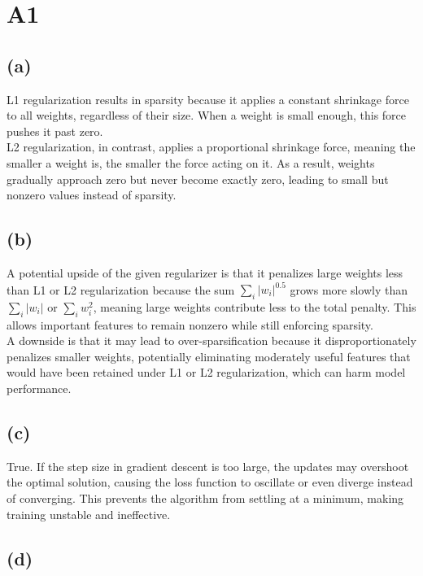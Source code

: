 \documentclass{article}
\begin{document}
\section*{A1}

\subsection*{(a)}

L1 regularization results in sparsity because it applies a constant shrinkage force to all weights, regardless of their size. When a weight is small enough, this force pushes it past zero.\\

\noindent L2 regularization, in contrast, applies a proportional shrinkage force, meaning the smaller a weight is, the smaller the force acting on it. As a result, weights gradually approach zero but never become exactly zero, leading to small but nonzero values instead of sparsity.

\subsection*{(b)}

A potential upside of the given regularizer is that it penalizes large weights less than L1 or L2 regularization because the sum \( \sum_i |w_i|^{0.5} \) grows more slowly than \( \sum_i |w_i| \) or \( \sum_i w_i^2 \), meaning large weights contribute less to the total penalty. This allows important features to remain nonzero while still enforcing sparsity.\\

\noindent A downside is that it may lead to over-sparsification because it disproportionately penalizes smaller weights, potentially eliminating moderately useful features that would have been retained under L1 or L2 regularization, which can harm model performance.

\subsection*{(c)}

True. If the step size in gradient descent is too large, the updates may overshoot the optimal solution, causing the loss function to oscillate or even diverge instead of converging. This prevents the algorithm from settling at a minimum, making training unstable and ineffective.

\subsection*{(d)}
\end{document}
